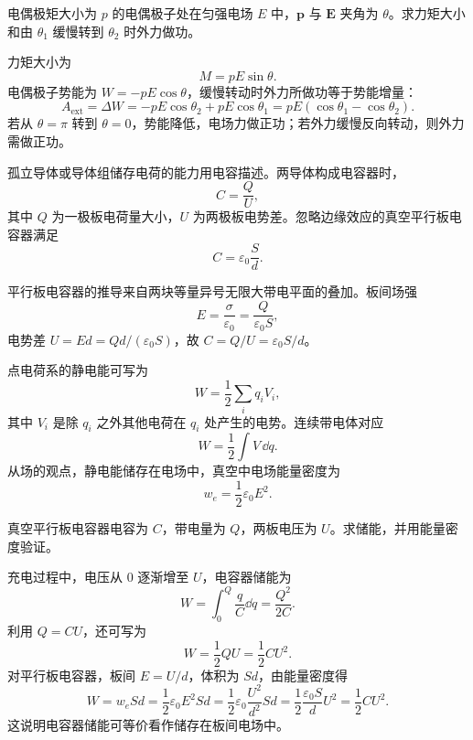 \begin{example}[title={电偶极子在均匀电场中的转动趋势}]\label{eg:dipole-example}
电偶极矩大小为 $p$ 的电偶极子处在匀强电场 $E$ 中，$\bm p$ 与 $\bm E$ 夹角为 $\theta$。求力矩大小和由 $\theta_1$ 缓慢转到 $\theta_2$ 时外力做功。
\begin{solution}
力矩大小为
\[
  M=pE\sin\theta.
\]
电偶极子势能为 $W=-pE\cos\theta$，缓慢转动时外力所做功等于势能增量：
\[
  A_{\mathrm{ext}}=\Delta W
  =-pE\cos\theta_2+pE\cos\theta_1
  =pE(\cos\theta_1-\cos\theta_2).
\]
若从 $\theta=\pi$ 转到 $\theta=0$，势能降低，电场力做正功；若外力缓慢反向转动，则外力需做正功。
\end{solution}
\end{example}

\begin{definition}[电容和平行板电容器]\label{def:capacitance}
孤立导体或导体组储存电荷的能力用电容描述。两导体构成电容器时，
\[
  C=\frac{Q}{U},
\]
其中 $Q$ 为一极板电荷量大小，$U$ 为两极板电势差。忽略边缘效应的真空平行板电容器满足
\[
  C=\varepsilon_0\frac{S}{d}.
\]
\end{definition}

平行板电容器的推导来自两块等量异号无限大带电平面的叠加。板间场强
\[
  E=\frac{\sigma}{\varepsilon_0}=\frac{Q}{\varepsilon_0S},
\]
电势差 $U=Ed=Qd/(\varepsilon_0S)$，故 $C=Q/U=\varepsilon_0S/d$。

\begin{definition}[静电能与电场能量密度]\label{def:electrostatic-energy}
点电荷系的静电能可写为
\[
  W=\frac12\sum_i q_iV_i,
\]
其中 $V_i$ 是除 $q_i$ 之外其他电荷在 $q_i$ 处产生的电势。连续带电体对应
\[
  W=\frac12\int V\,\dd q.
\]
从场的观点，静电能储存在电场中，真空中电场能量密度为
\[
  w_e=\frac12\varepsilon_0E^2.
\]
\end{definition}

\begin{example}[title={平行板电容器的储能}]\label{eg:parallel-plate-energy}
真空平行板电容器电容为 $C$，带电量为 $Q$，两板电压为 $U$。求储能，并用能量密度验证。
\begin{solution}
充电过程中，电压从 $0$ 逐渐增至 $U$，电容器储能为
\[
  W=\int_0^Q \frac{q}{C}\dd q=\frac{Q^2}{2C}.
\]
利用 $Q=CU$，还可写为
\[
  W=\frac12QU=\frac12CU^2.
\]
对平行板电容器，板间 $E=U/d$，体积为 $Sd$，由能量密度得
\[
  W=w_eSd=\frac12\varepsilon_0E^2Sd
  =\frac12\varepsilon_0\frac{U^2}{d^2}Sd
  =\frac12\frac{\varepsilon_0S}{d}U^2
  =\frac12CU^2.
\]
这说明电容器储能可等价看作储存在板间电场中。
\end{solution}
\end{example}

